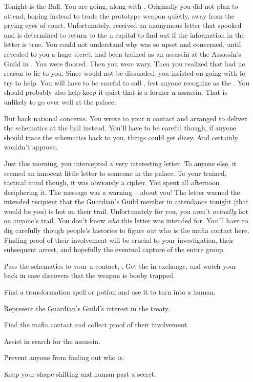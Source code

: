 \documentclass[char]{NeptuneBall}
\begin{document}
Tonight is the \cExExKing{} Ball. You are going, along with \cQueen{}. Originally you did not plan to attend, hoping instead to trade  the prototype weapon quietly, away from the prying eyes of court. Unfortunately, \cQueen{} received an anonymous letter that spooked \cQueen{\them} and \cQueen{\they} is determined to return to the \pAtlantis{}n capital to find out if the information in the letter is true. You could not understand why \cQueen{} was so upset and concerned, until \cQueen{\they} revealed to you a huge secret. \cQueen{} had been trained as an assassin at the Assassin's Guild in \pPacifica{}. You were floored. Then you were wary. Then you realized that \cQueen had no reason to lie to you. Since \cQueen{\they} would not be dissuaded, you insisted on going with \cQueen{\them} to try to help. You will have to be careful to call \cQueen{\them} \cQueen{\MYname}, lest anyone recognize \cQueen{\them} as the \cQueen{\King}. You should probably also help keep it quiet that  is a former \pPacifica{}n assassin. That is unlikely to go over well at the palace.

But back national concerns. You wrote to your \pPacifica{}n contact and arranged to deliver the schematics at the ball instead. You'll have to be careful though, if anyone should trace the schematics back to you, things could get dicey. And \cQueen{} certainly wouldn't approve.

Just this morning, you intercepted a very interesting letter. To anyone else, it seemed an innocent little letter to someone in the palace. To your trained, tactical mind though, it was obviously a cipher. You spent all afternoon deciphering it. The message was a warning -- about you! The letter warned the intended recipient that the Guardian's Guild member in attendance tonight (that would be you) is hot on their trail. Unfortunately for you, you aren't \emph{actually} hot on anyone's trail. You don't know \emph{who} this letter was intended for. You'll have to dig carefully though people's histories to figure out who is the mafia contact here. Finding proof of their involvement will be crucial to your investigation, their subsequent arrest, and hopefully the eventual capture of the entire group.


\begin{itemz}[Goals]
  \item Pass the schematics to your \pPacifica{}n contact, \cSpy{}. Get the \iBattlePlan{} in exchange, and watch your back in case \cSpy{\they} discovers that the weapon is booby trapped.
  \item Find a transformation spell or potion and use it to turn \cQueen{} into a human.
  \item Represent the Guardian's Guild's interest in the treaty.
  \item Find the mafia contact and collect proof of their involvement.
  \item Assist \cQueen{} in \cQueen{\their} search for the assassin.
  \item Prevent anyone from finding out who \cQueen{} is.
  \item Keep your shape shifting and human past a secret.
\end{itemz}
\end{document}
